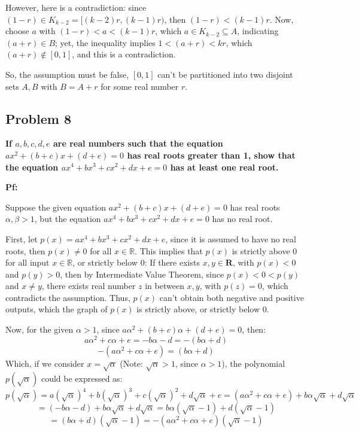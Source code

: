 \documentclass{article}
\begin{document}
However, here is a contradiction: since $(1-r)\in K_{k-2}=[(k-2)r,(k-1)r)$, then $(1-r)<(k-1)r$. Now, choose $a$ with $(1-r)<a<(k-1)r$, which $a\in K_{k-2}\subseteq A$, indicating $(a+r)\in B$; yet, the inequality implies $1<(a+r)<kr$, which $(a+r)\notin [0,1]$, and this is a contradiction.

So, the assumption must be false, $[0,1]$ can't be partitioned into two disjoint sets $A,B$ with $B=A+r$ for some real number $r$.

\hfill

\subsection{Problem 8}
\textbf{If $a, b, c, d, e$ are real numbers such that the equation
$ax^2+(b+c)x+(d+e)=0$
has real roots greater than 1, show that the equation
$ax^4+bx^3+cx^2+dx+e=0$
has at least one real root.}

\textbf{Pf:}

Suppose the given equation $ax^2+(b+c)x+(d+e)=0$ has real roots $\alpha,\beta>1$, but the equation $ax^4+bx^3+cx^2+dx+e=0$ has no real root.

\hfill

First, let $p(x)=ax^4+bx^3+cx^2+dx+e$, since it is assumed to have no real roots, then $p(x)\neq 0$ for all $x\in\mathbb{R}$. This implies that $p(x)$ is strictly above $0$ for all input $x\in\mathbb{R}$, or strictly below $0$: If there exists $x,y\in\mathbf{R}$, with $p(x)<0$ and $p(y)>0$, then by Intermediate Value Theorem, since $p(x)<0<p(y)$ and $x\neq y$, there exists real number $z$ in between $x,y$, with $p(z)=0$, which contradicts the assumption. Thus, $p(x)$ can't obtain both negative and positive outputs, which the graph of $p(x)$ is strictly above, or strictly below $0$.

\hfill

Now, for the given $\alpha >1$, since $a\alpha^2 + (b+c)\alpha + (d+e)=0$, then:
$$a\alpha^2 + c\alpha+e = -b\alpha-d=-(b\alpha+d)$$
$$-(a\alpha^2 + c\alpha+e)=(b\alpha+d)$$
Which, if we consider $x=\sqrt{\alpha}$ (Note: $\sqrt{\alpha}>1$, since $\alpha>1$), the polynomial $p(\sqrt{\alpha})$ could be expressed as:
$$p(\sqrt{\alpha})=a(\sqrt{\alpha})^4+b(\sqrt{\alpha})^3+c(\sqrt{\alpha})^2+d\sqrt{\alpha}+e = (a\alpha^2+c\alpha+e)+b\alpha\sqrt{\alpha}+d\sqrt{\alpha}$$
$$=(-b\alpha-d)+b\alpha\sqrt{\alpha}+d\sqrt{\alpha} = b\alpha(\sqrt{\alpha}-1)+d(\sqrt{\alpha}-1)$$
$$=(b\alpha+d)(\sqrt{\alpha}-1) = -(a\alpha^2+c\alpha+e)(\sqrt{\alpha}-1)$$
\end{document}
